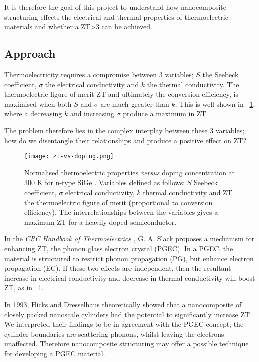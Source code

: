 \documentclass[12pt]{article}
\newcommand{\figref}[2][\figurename~]{#1\ref{#2}}
\begin{document}
It is therefore the goal of this project to understand how nanocomposite structuring effects the electrical and thermal properties of thermoelectric materials and whether a ZT\textgreater3 can be achieved.

\subsection{Approach}
\label{sec:approach}
Thermoelectricity requires a compromise between 3 variables; $S$ the Seebeck coefficient, $\sigma$ the electrical conductivity and $k$ the thermal conductivity. The thermoelectric figure of merit ZT and ultimately the conversion efficiency, is maximised when both $S$ and $\sigma$ are much greater than $k$. This is well shown in \figref{fig:zt-vs-doping}, where a decreasing $k$ and increasing $\sigma$ produce a maximum in ZT.

The problem therefore lies in the complex interplay between these 3 variables; how do we disentangle their relationships and produce a positive effect on ZT?

\begin{figure}
	\centering
	\texttt{[image: zt-vs-doping.png]}
	\caption{Normalised thermoelectric properties \emph{versus} doping concentration at 300 K for n-type SiGe \cite{minnich-review}. Variables defined as follows: $S$ Seebeck coefficient, $\sigma$ electrical conductivity, $k$ thermal conductivity and ZT the thermoelectric figure of merit (proportional to conversion efficiency). The interrelationships between the variables gives a maximum ZT for a heavily doped semiconductor.}
	\label{fig:zt-vs-doping}
\end{figure}

In the \emph{CRC Handbook of Thermoelectrics} \cite{crc-handbook}, G. A. Slack proposes a mechanism for enhancing ZT, the phonon glass electron crystal (PGEC). In a PGEC, the material is structured to restrict phonon propagation (PG), but enhance electron propagation (EC). If these two effects are independent, then the resultant increase in electrical conductivity and decrease in thermal conductivity will boost ZT, as in \figref{fig:zt-vs-doping}.

In 1993, Hicks and Dresselhaus theoretically showed that a nanocomposite of closely packed nanoscale cylinders had the potential to significantly increase ZT \cite{nanowires}. We interpreted their findings to be in agreement with the PGEC concept; the cylinder boundaries are scattering phonons, whilst leaving the electrons unaffected. Therefore nanocomposite structuring may offer a possible technique for developing a PGEC material.
\end{document}

